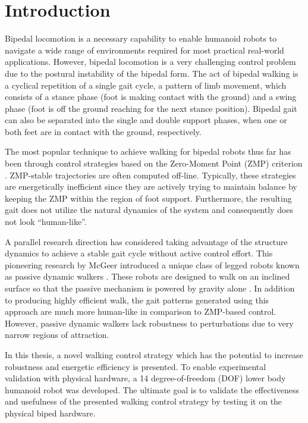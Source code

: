\chapter{Introduction} %
\label{cha:introduction}
Bipedal locomotion is a necessary capability to enable humanoid robots to navigate a wide range of environments required for most practical real-world applications. However, bipedal locomotion is a very challenging control problem due to the postural instability of the bipedal form. The act of bipedal walking is a cyclical repetition of a single gait cycle, a pattern of limb movement, which consists of a stance phase (foot is making contact with the ground) and a swing phase (foot is off the ground reaching for the next stance position). Bipedal gait can also be separated into the single and double support phases, when one or both feet are in contact with the ground, respectively. 

The most popular technique to achieve walking for bipedal robots thus far has been through control strategies based on the Zero-Moment Point (ZMP) criterion \cite{Vukobratovic:2004wy}. ZMP-stable trajectories are often computed off-line. Typically, these strategies \cite{Kajita:1997vr,Sugihara:2002kq} are energetically inefficient since they are actively trying to maintain balance by keeping the ZMP within the region of foot support. Furthermore, the resulting gait does not utilize the natural dynamics of the system and consequently does not look ``human-like''. 

A parallel research direction has considered taking advantage of the structure dynamics to achieve a stable gait cycle without active control effort. This pioneering research by McGeer \cite{McGeer:1990uk} introduced a unique class of legged robots known as passive dynamic walkers \cite{Collins:2005vp}. These robots are designed to walk on an inclined surface so that the passive mechanism is powered by gravity alone \cite{Spong:1999vk}. In addition to producing highly efficient walk, the gait patterns generated using this approach are much more human-like in comparison to ZMP-based control. However, passive dynamic walkers lack robustness to perturbations due to very narrow regions of attraction. 

In this thesis, a novel walking control strategy which has the potential to increase robustness and energetic efficiency is presented. To enable experimental validation with physical hardware, a 14 degree-of-freedom (DOF) lower body humanoid robot was developed. The ultimate goal is to validate the effectiveness and usefulness of the presented walking control strategy by testing it on the physical biped hardware. 


